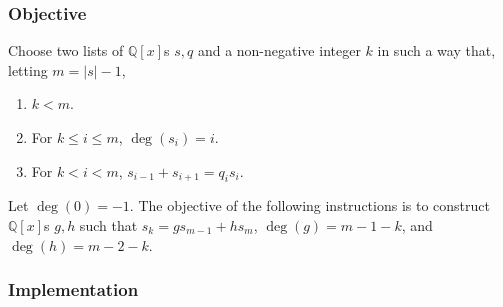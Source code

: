 \documentclass[twocolumn]{article}
\begin{document}
			\subsubsection{Objective}
				Choose two lists of $\mathbb{Q}[x]$s $s,q$ and a non-negative integer $k$ in such a way that, letting $m=\lvert s\rvert-1$,
				\begin{enumerate}
					\item $k<m$.
					\item For $k\le i\le m$, $\deg(s_i)=i$.
					\item For $k<i<m$, $s_{i-1}+s_{i+1}=q_is_i$.
				\end{enumerate}
				Let $\deg(0)=-1$. The objective of the following instructions is to construct $\mathbb{Q}[x]$s $g,h$ such that $s_k=gs_{m-1}+hs_m$, $\deg(g)=m-1-k$, and $\deg(h)=m-2-k$.
			\subsubsection{Implementation}
\end{document}

